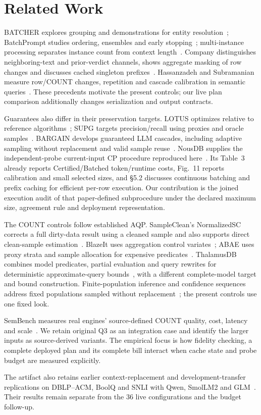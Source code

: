 \section{Related Work}
BATCHER explores grouping and demonstrations for entity resolution~\cite{batcher}; BatchPrompt studies ordering, ensembles and early stopping~\cite{batchprompt}; multi-instance processing separates instance count from context length~\cite{mip}. Company distinguishes neighboring-text and prior-verdict channels, shows aggregate masking of row changes and discusses cached singleton prefixes~\cite{company}. Hassanzadeh and Subramanian measure row/COUNT changes, repetition and cascade calibration in semantic queries~\cite{runvariance}. These precedents motivate the present controls; our live plan comparison additionally changes serialization and output contracts.

Guarantees also differ in their preservation targets. LOTUS optimizes relative to reference algorithms~\cite{lotus}; SUPG targets precision/recall using proxies and oracle samples~\cite{supg}. BARGAIN develops guaranteed LLM cascades, including adaptive sampling without replacement and valid sample reuse~\cite{bargain}. NousDB supplies the independent-probe current-input CP procedure reproduced here~\cite{nousdb}. Its Table~3 already reports Certified/Batched token/runtime costs, Fig.~11 reports calibration and small selected sizes, and \S5.2 discusses continuous batching and prefix caching for efficient per-row execution. Our contribution is the joined execution audit of that paper-defined subprocedure under the declared maximum size, agreement rule and deployment representation.

The COUNT controls follow established AQP. SampleClean's NormalizedSC corrects a full dirty-data result using a cleaned sample and also supports direct clean-sample estimation~\cite{sampleclean}. BlazeIt uses aggregation control variates~\cite{blazeit}; ABAE uses proxy strata and sample allocation for expensive predicates~\cite{abae}. ThalamusDB combines model predicates, partial evaluation and query rewrites for deterministic approximate-query bounds~\cite{thalamus}, with a different complete-model target and bound construction. Finite-population inference and confidence sequences address fixed populations sampled without replacement~\cite{worcs}; the present controls use one fixed look.

SemBench measures real engines' source-defined COUNT quality, cost, latency and scale~\cite{sembench}. We retain original Q3 as an integration case and identify the larger inputs as source-derived variants. The empirical focus is how fidelity checking, a complete deployed plan and its complete bill interact when cache state and probe budget are measured explicitly.

The artifact also retains earlier context-replacement and development-transfer replications on DBLP--ACM, BoolQ and SNLI with Qwen, SmolLM2 and GLM~\cite{leipzig2010,deepmatcher,boolq,snli,smol}. Their results remain separate from the 36 live configurations and the budget follow-up.

